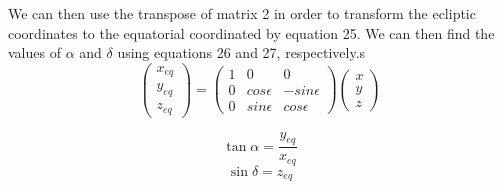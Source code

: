 \documentclass[letterpaper,12pt]{article}
\begin{document}
We can then use the transpose of matrix 2 in order to transform the ecliptic coordinates to the equatorial coordinated by equation 25. We can then find the values of \begin{math} \alpha \end{math} and \begin{math} \delta \end{math} using equations 26 and 27, respectively.s
\begin{equation}
\begin{pmatrix}
  x_{eq} \\
  y_{eq} \\
  z_{eq}
 \end{pmatrix} 
  =
\begin{pmatrix}
1 & 0 & 0 \\ 
 0 & cos\epsilon & -sin\epsilon\\ 
 0 & sin\epsilon & cos\epsilon
\end{pmatrix}
\begin{pmatrix}
  x \\
  y \\
  z
\end{pmatrix} 
\end{equation}



\begin{equation}
\tan \alpha= \frac{y_{eq}}{x_{eq}}
\end{equation}
\begin{equation}
\sin \delta= z_{eq}
\end{equation}
\end{document}
